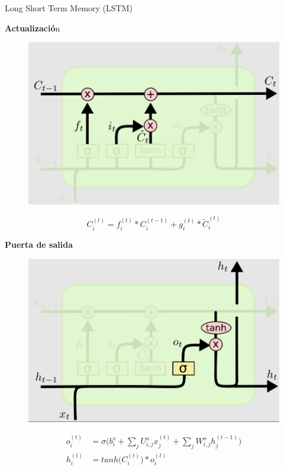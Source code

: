 \begin{frame}{Long Short Term Memory (LSTM)}
\begin{overprint}
        \begin{center} \textbf{Actualizació}n \end{center}
        \begin{figure}
            \centering
            \includegraphics[keepaspectratio=true,height=0.7\paperheight,width=0.7\linewidth]{Images/puerta3.png}
        \end{figure}
        \begin{equation*}
        C^{(t)}_i = f^{(t)}_i * C^{(t-1)}_i + g^{(t)}_i * \tilde{C}_i^{(t)}
        \end{equation*}
        \begin{center} \textbf{Puerta de salida} \end{center}
        \begin{figure}
            \centering
            \vspace{-0.5cm}
            \includegraphics[keepaspectratio=true,height=0.6\paperheight,width=0.65\linewidth]{Images/puerta4.png}
        \end{figure}
        \begin{equation*}
            \begin{aligned}
                o^{(t)}_i & = \sigma \Big( b^o_i + \sum_j U^o_{i,j} x^{(t)}_j + \sum_j W^o_{i,j} h^{(t-1)}_j \Big) \\
                h^{(t)}_i & = tanh \big( C^{(t)}_i \big) * o^{(t)}_i
            \end{aligned}
        \end{equation*}
        
       
\end{overprint}
\end{frame} 


